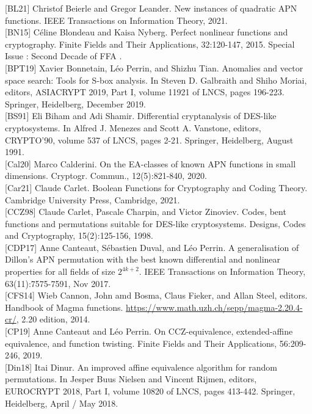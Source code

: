 \documentclass[10pt]{article}
\begin{document}
[BL21] Christof Beierle and Gregor Leander. New instances of quadratic APN functions. IEEE Transactions on Information Theory, 2021.\\[0pt]
[BN15] Céline Blondeau and Kaisa Nyberg. Perfect nonlinear functions and cryptography. Finite Fields and Their Applications, 32:120-147, 2015. Special Issue : Second Decade of FFA .\\[0pt]
[BPT19] Xavier Bonnetain, Léo Perrin, and Shizhu Tian. Anomalies and vector space search: Tools for S-box analysis. In Steven D. Galbraith and Shiho Moriai, editors, ASIACRYPT 2019, Part I, volume 11921 of LNCS, pages 196-223. Springer, Heidelberg, December 2019.\\[0pt]
[BS91] Eli Biham and Adi Shamir. Differential cryptanalysis of DES-like cryptosystems. In Alfred J. Menezes and Scott A. Vanstone, editors, CRYPTO'90, volume 537 of LNCS, pages 2-21. Springer, Heidelberg, August 1991.\\[0pt]
[Cal20] Marco Calderini. On the EA-classes of known APN functions in small dimensions. Cryptogr. Commun., 12(5):821-840, 2020.\\[0pt]
[Car21] Claude Carlet. Boolean Functions for Cryptography and Coding Theory. Cambridge University Press, Cambridge, 2021.\\[0pt]
[CCZ98] Claude Carlet, Pascale Charpin, and Victor Zinoviev. Codes, bent functions and permutations suitable for DES-like cryptosystems. Designs, Codes and Cryptography, 15(2):125-156, 1998.\\[0pt]
[CDP17] Anne Canteaut, Sébastien Duval, and Léo Perrin. A generalisation of Dillon's APN permutation with the best known differential and nonlinear properties for all fields of size $2^{4 k+2}$. IEEE Transactions on Information Theory, 63(11):7575-7591, Nov 2017.\\[0pt]
[CFS14] Wieb Cannon, John amd Bosma, Claus Fieker, and Allan Steel, editors. Handbook of Magma functions. \href{https://www.math.uzh.ch/sepp/magma-2.20.4-cr/}{https://www.math.uzh.ch/sepp/magma-2.20.4-cr/}, 2.20 edition, 2014.\\[0pt]
[CP19] Anne Canteaut and Léo Perrin. On CCZ-equivalence, extended-affine equivalence, and function twisting. Finite Fields and Their Applications, 56:209-246, 2019.\\[0pt]
[Din18] Itai Dinur. An improved affine equivalence algorithm for random permutations. In Jesper Buus Nielsen and Vincent Rijmen, editors, EUROCRYPT 2018, Part I, volume 10820 of LNCS, pages 413-442. Springer, Heidelberg, April / May 2018.\\[0pt]
\end{document}
